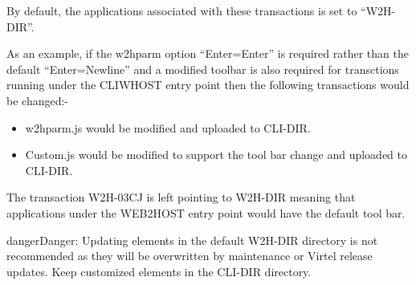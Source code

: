 \documentclass[letterpaper,10pt,english]{sphinxmanual}
\begin{document}
By default, the applications associated with these transactions is set to “W2H-DIR”.

As an example, if the w2hparm option “Enter=Enter” is required rather than the default “Enter=Newline” and a modified toolbar is also required for transctions running under the CLIWHOST entry point then the following transactions would be changed:-

\begin{sphinxVerbatim}[commandchars=\\\{\}]
                   
                    
                     
\end{sphinxVerbatim}
\begin{itemize}
\item {} 
w2hparm.js would be modified and uploaded to CLI-DIR.

\item {} 
Custom.js would be modified to support the tool bar change and uploaded to CLI-DIR.

\end{itemize}

The transaction W2H-03CJ is left pointing to W2H-DIR meaning that applications under the WEB2HOST entry point would have the default tool bar.

\begin{sphinxadmonition}{danger}{Danger:}
Updating elements in the default W2H-DIR directory is not recommended as they will be overwritten by maintenance or Virtel release updates. Keep customized elements in the CLI-DIR directory.
\end{sphinxadmonition}
\end{document}
